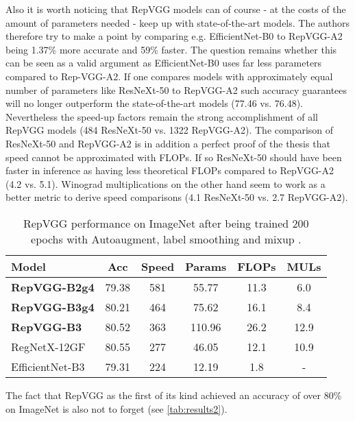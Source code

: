 Also it is worth noticing that RepVGG models can of course - at the costs of the amount of parameters needed - keep up with state-of-the-art models. The authors therefore try to make a point by comparing e.g. EfficientNet-B0 to RepVGG-A2 being 1.37\% more accurate and 59\% faster. The question remains whether this can be seen as a valid argument as EfficientNet-B0 uses far less parameters compared to Rep-VGG-A2. If one compares models with approximately equal number of parameters like ResNeXt-50 to RepVGG-A2 such accuracy guarantees will no longer outperform the state-of-the-art models (77.46 vs. 76.48). Nevertheless the speed-up factors remain the strong accomplishment of all RepVGG models (484 ResNeXt-50 vs. 1322 RepVGG-A2). The comparison of ResNeXt-50 and RepVGG-A2 is in addition a perfect proof of the thesis that speed cannot be approximated with FLOPs. If so ResNeXt-50 should have been faster in inference as having less theoretical FLOPs compared to RepVGG-A2 (4.2 vs. 5.1). Winograd multiplications on the other hand seem to work as a better metric to derive speed comparisons (4.1 ResNeXt-50 vs. 2.7 RepVGG-A2). 

\setlength{\tabcolsep}{3pt}
\begin{table}
	\begin{center}
		\begin{tabular}{lccccc} 
			\hline
			Model & Acc & Speed & Params & FLOPs & MULs \\
			\hline
			\textbf{RepVGG-B2g4} & 79.38 & 581 & 55.77 & 11.3 & 6.0 \\
			\textbf{RepVGG-B3g4} & 80.21 & 464 & 75.62 & 16.1 & 8.4 \\
			\textbf{RepVGG-B3} & 80.52 & 363 & 110.96 & 26.2 & 12.9 \\
			RegNetX-12GF & 80.55 & 277 & 46.05 & 12.1 & 10.9 \\
			EfficientNet-B3 & 79.31 & 224 & 12.19 & 1.8 & - \\
			\hline
		\end{tabular}
	\end{center}
	\caption{RepVGG performance on ImageNet \cite{JiaDeng.2009} after being trained 200 epochs with Autoaugment, label smoothing and mixup \cite{XiaohanDing.2021}.}
	\label{tab:results2}
\end{table}
\setlength{\tabcolsep}{6pt}

The fact that RepVGG as the first of its kind achieved an accuracy of over 80\% on ImageNet \cite{JiaDeng.2009} is also not to forget (see \autoref{tab:results2}).

